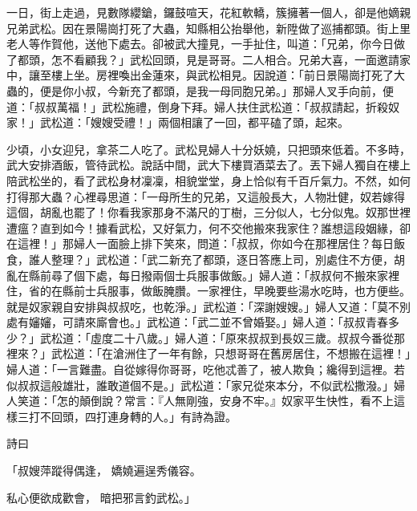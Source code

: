 \begin{showcontents}{}
一日，街上走過，見數隊纓鎗，鑼鼓喧天，花紅軟轎，簇擁著一個人，卻是他嫡親兄弟武松。因在景陽崗打死了大蟲，知縣相公抬舉他，新陞做了巡捕都頭。街上里老人等作賀他，送他下處去。卻被武大撞見，一手扯住，叫道：「兄弟，你今日做了都頭，怎不看顧我？」武松回頭，見是哥哥。二人相合。兄弟大喜，一面邀請家中，讓至樓上坐。房裡喚出金蓮來，與武松相見。因說道：「前日景陽崗打死了大蟲的，便是你小叔，今新充了都頭，是我一母同胞兄弟。」那婦人叉手向前，便道：「叔叔萬福！」武松施禮，倒身下拜。婦人扶住武松道：「叔叔請起，折殺奴家！」武松道：「嫂嫂受禮！」兩個相讓了一回，都平磕了頭，起來。

少頃，小女迎兒，拿茶二人吃了。武松見婦人十分妖嬈，只把頭來低着。不多時，武大安排酒飯，管待武松。說話中間，武大下樓買酒菜去了。丟下婦人獨自在樓上陪武松坐的，看了武松身材凜凜，相貌堂堂，身上恰似有千百斤氣力。不然，如何打得那大蟲？心裡尋思道：「一母所生的兄弟，又這般長大，人物壯健，奴若嫁得這個，胡亂也罷了！你看我家那身不滿尺的丁樹，三分似人，七分似鬼。奴那世裡遭瘟？直到如今！據看武松，又好氣力，何不交他搬來我家住？誰想這段姻緣，卻在這裡！」那婦人一面臉上排下笑來，問道：「叔叔，你如今在那裡居住？每日飯食，誰人整理？」武松道：「武二新充了都頭，逐日答應上司，別處住不方便，胡亂在縣前尋了個下處，每日撥兩個士兵服事做飯。」婦人道：「叔叔何不搬來家裡住，省的在縣前士兵服事，做飯腌臢。一家裡住，早晚要些湯水吃時，也方便些。就是奴家親自安排與叔叔吃，也乾淨。」武松道：「深謝嫂嫂。」婦人又道：「莫不別處有嬸嬸，可請來廝會也。」武松道：「武二並不曾婚娶。」婦人道：「叔叔青春多少？」武松道：「虛度二十八歲。」婦人道：「原來叔叔到長奴三歲。叔叔今番從那裡來？」武松道：「在滄洲住了一年有餘，只想哥哥在舊房居住，不想搬在這裡！」婦人道：「一言難盡。自從嫁得你哥哥，吃他忒善了，被人欺負；纔得到這裡。若似叔叔這般雄壯，誰敢道個不是。」武松道：「家兄從來本分，不似武松撒潑。」婦人笑道：「怎的顛倒說？常言：『人無剛強，安身不牢。』奴家平生快性，看不上這樣三打不回頭，四打連身轉的人。」有詩為證。

詩曰

「叔嫂萍蹤得偶逢，  嬌嬈遍逞秀儀容。

私心便欲成歡會，  暗把邪言釣武松。」


\end{showcontents}

